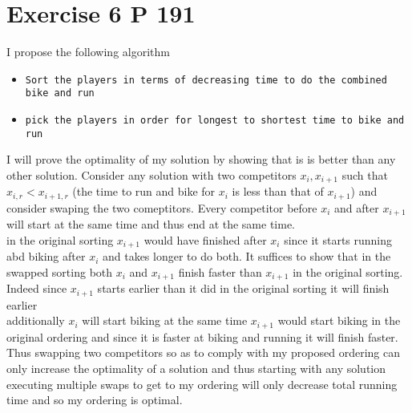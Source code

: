 \documentclass{amsart}
\begin{document}
\section{Exercise 6 P 191}
I propose the following algorithm
{\small
    \begin{itemize}
        \item \texttt{Sort the players in terms of decreasing time to do the combined bike and run}
        \item \texttt{pick the players in order for longest to shortest time to bike and run}
    \end{itemize}
}
I will prove the optimality of my solution by showing that is is better than any other solution.
Consider any solution with two competitors $x_i,x_{i+1}$ such that $x_{i,r} < x_{i+1,r}$ (the time to run and bike for  $x_i$ is less
than that of $x_{i+1}$) and consider swaping the two comeptitors. Every competitor before  $x_i$ and after $x_{i+1}$ will start at the same time
and thus end at the same time. \\
in the original sorting $x_{i+1}$ would have finished after $x_i$ since it starts running abd biking after $x_i$ and takes longer to do both.
It suffices to show that in the swapped sorting both $x_i$ and $x_{i+1}$ finish faster than $x_{i+1}$ in the original sorting.\\
Indeed since $x_{i+1}$ starts earlier than it did in the original sorting it will finish earlier\\
additionally $x_{i}$ will start biking at the same time $x_{i+1}$ would start biking in the original ordering  and since
it is faster at biking and running it will finish faster. Thus swapping two competitors so as to comply with my proposed ordering can only increase
the optimality of a solution and thus starting with any solution executing multiple swaps to get to my ordering will only decrease total running time and so my ordering is optimal.
\end{document}

